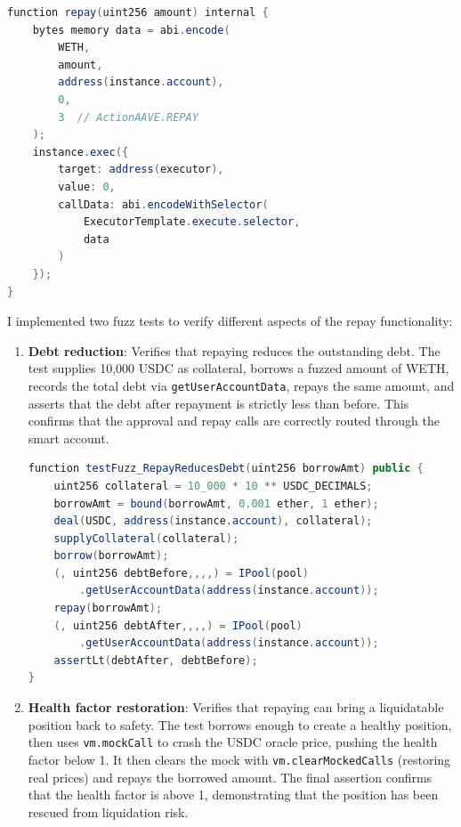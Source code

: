 \begin{lstlisting}[language=Java,caption={Repay helper function},label=lst:test-repay-helper]
function repay(uint256 amount) internal {
    bytes memory data = abi.encode(
        WETH,
        amount,
        address(instance.account),
        0,
        3  // ActionAAVE.REPAY
    );
    instance.exec({
        target: address(executor),
        value: 0,
        callData: abi.encodeWithSelector(
            ExecutorTemplate.execute.selector,
            data
        )
    });
}
\end{lstlisting}

I implemented two fuzz tests to verify different aspects of the repay functionality:

\begin{enumerate}
    \item \textbf{Debt reduction}: Verifies that repaying reduces the outstanding debt. The test supplies 10,000 USDC as collateral, borrows a fuzzed amount of WETH, records the total debt via \texttt{getUserAccountData}, repays the same amount, and asserts that the debt after repayment is strictly less than before. This confirms that the approval and repay calls are correctly routed through the smart account.

\begin{lstlisting}[language=Java,caption={Repay debt reduction test},label=lst:test-repay-debt]
function testFuzz_RepayReducesDebt(uint256 borrowAmt) public {
    uint256 collateral = 10_000 * 10 ** USDC_DECIMALS;
    borrowAmt = bound(borrowAmt, 0.001 ether, 1 ether);
    deal(USDC, address(instance.account), collateral);
    supplyCollateral(collateral);
    borrow(borrowAmt);
    (, uint256 debtBefore,,,,) = IPool(pool)
        .getUserAccountData(address(instance.account));
    repay(borrowAmt);
    (, uint256 debtAfter,,,,) = IPool(pool)
        .getUserAccountData(address(instance.account));
    assertLt(debtAfter, debtBefore);
}
\end{lstlisting}

    \item \textbf{Health factor restoration}: Verifies that repaying can bring a liquidatable position back to safety. The test borrows enough to create a healthy position, then uses \texttt{vm.mockCall} to crash the USDC oracle price, pushing the health factor below 1. It then clears the mock with \texttt{vm.clearMockedCalls} (restoring real prices) and repays the borrowed amount. The final assertion confirms that the health factor is above 1, demonstrating that the position has been rescued from liquidation risk.


\end{enumerate}
